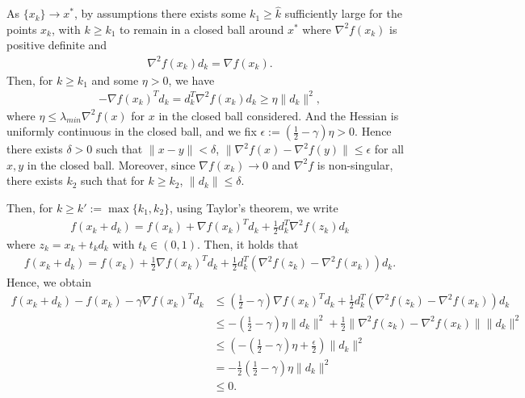 \documentclass{ExerciseSheet}
\begin{document}
\begin{solution}
    As $\{x_k\}\rightarrow x^*$, by assumptions there exists some $k_1\geq \hat{k}$ sufficiently large for the points $x_k$, with $k\geq k_1$ to remain in a closed ball around $x^*$ where $\nabla^2 f(x_k)$ is positive definite and 
    \begin{align*}
         \nabla^2 f(x_k)d_k = \nabla f(x_k).
    \end{align*}
    Then, for $k\geq k_1$ and some $\eta>0$, we have
    \begin{align*}
        -\nabla f(x_k)^T d_k = d_k^T\nabla^2 f(x_k)d_k \geq \eta \lVert d_k\rVert^2,
    \end{align*}
    where $\eta\leq \lambda_{min}\nabla^2 f(x)$ for $x$ in the closed ball considered. And the Hessian is uniformly continuous in the closed ball, and we fix  $\epsilon := \left(\frac{1}{2}-\gamma\right)\eta>0$. Hence there exists $\delta>0$ such that $\lVert x-y\rVert<\delta$, $\lVert \nabla^2 f(x)-\nabla^2f(y)\lVert \leq  \epsilon$ for all $x,y$ in the closed ball. Moreover, since $\nabla f(x_k)\rightarrow 0$ and $\nabla^2 f$ is non-singular, there exists $k_2$ such that for $k\geq k_2$, $\lVert d_k\rVert \leq \delta$.
    
    Then, for $k \geq k':=\max\{k_1,k_2\}$, using Taylor's theorem, we write
    \begin{align*}
        f(x_k+d_k) = f(x_k) + \nabla f(x_k)^T d_k + \frac{1}{2} d_k^T\nabla^2 f(z_k)d_k
    \end{align*}
    where $z_k=x_k+t_kd_k$ with $t_k \in (0,1)$. Then, it holds that
    \begin{align*}
        f(x_k+d_k) = f(x_k) +\frac{1}{2} \nabla f(x_k)^T d_k + \frac{1}{2} d_k^T(\nabla^2 f(z_k)-\nabla^2 f(x_k))d_k.
    \end{align*}
    Hence, we obtain
    \begin{align*}
        f(x_k+d_k)- f(x_k)-\gamma\nabla f(x_k)^T d_k &\leq \left(\frac{1}{2}-\gamma\right)\nabla f(x_k)^T d_k+ \frac{1}{2} d_k^T(\nabla^2 f(z_k)-\nabla^2 f(x_k))d_k \\
        & \leq -\left(\frac{1}{2}-\gamma\right)\eta \lVert d_k\rVert^2 + \frac{1}{2}\lVert \nabla^2 f(z_k)-\nabla^2 f(x_k)\rVert\lVert d_k\rVert^2\\
        & \leq \left(-\left(\frac{1}{2}-\gamma\right)\eta+\frac{\epsilon}{2}\right)\lVert d_k\rVert^2\\
        & = -\frac{1}{2}\left(\frac{1}{2}-\gamma\right)\eta\lVert d_k\rVert^2\\
        &\leq 0.
    \end{align*}
\end{solution}
\end{document}
